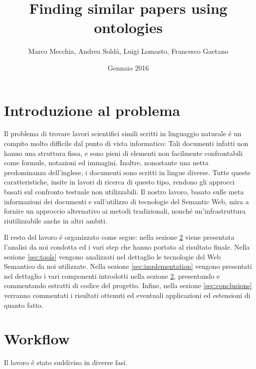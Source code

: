 \documentclass[11pt,twoside,a4paper]{article}
\begin{document}
\title{Finding similar papers using ontologies}
\author{Marco Mecchia, Andrea Sold\'a, Luigi Lomasto, Francesco Gaetano}
\date{Gennaio 2016}
\maketitle
\section{Introduzione al problema}
Il problema di trovare lavori scientifici simili scritti in linguaggio naturale \'e un compito molto difficile dal punto di vista informatico: Tali documenti infatti non hanno una struttura fissa, e sono pieni  di elementi non facilmente confrontabili come formule, notazioni ed immagini. Inoltre, nonostante una netta predominanza dell'inglese, i documenti sono scritti in lingue diverse. Tutte queste caratteristiche, insite in lavori di ricerca di questo tipo, rendono gli approcci basati sul confronto testuale non utilizzabili. Il nostro lavoro, basato sulle meta informazioni dei documenti e sull'utilizzo di tecnologie del Semantic Web, mira a fornire un approccio alternativo ai metodi tradizionali, nonch\'e un'infrastruttura riutilizzabile anche in altri ambiti.

Il resto del lavoro \'e organizzato come segue: nella sezione \ref{sec:workflow} viene presentata l'analisi da noi condotta ed i vari step che hanno portato al risultato finale. Nella sezione \ref{sec:tools} vengono analizzati nel dettaglio le tecnologie del Web Semantico da noi utilizzate. Nella sezione \ref{sec:implementation} vengono presentati nel dettaglio i vari componenti introdotti nella sezione \ref{sec:workflow}, presentando e commentando estratti di codice del progetto. Infine, nella sezione \ref{sec:conclusions} verranno commentati i risultati ottenuti ed eventuali applicazioni ed estensioni di quanto fatto.

\section{Workflow}
\label{sec:workflow}
Il lavoro \'e stato suddiviso in diverse fasi. 
\end{document}
